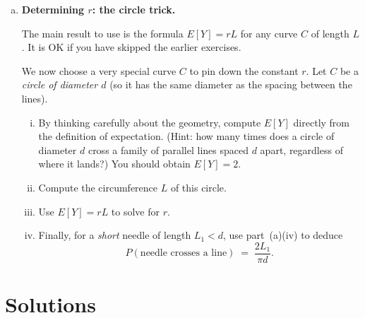 \documentclass[12pt]{article}
\begin{document}
\begin{enumerate}[(a)]
\begin{enumerate}[(i)]
    \item (Optional) Conclude that $E[Y] = rL$ holds for any rectifiable curve $C$
      of length $L$, for the same constant $r$ as before (which we have
      not yet determined).
  \end{enumerate}

\newpage

  \item \textbf{Determining $r$: the circle trick.}
  
  The main result to use is the formula $E[Y] = rL$ for any curve $C$ of length $L$.
  It is OK if you have skipped the earlier exercises.

  We now choose a very special curve $C$ to pin down the constant $r$.
  Let $C$ be a \emph{circle of diameter $d$} (so it has the same diameter
  as the spacing between the lines).

  \begin{enumerate}[(i)]
    \item By thinking carefully about the geometry, compute $E[Y]$
      directly from the definition of expectation. (Hint: how many times
      does a circle of diameter $d$ cross a family of parallel lines
      spaced $d$ apart, regardless of where it lands?) You should
      obtain $E[Y] = 2$.

    \item Compute the circumference $L$ of this circle.

    \item Use $E[Y] = rL$ to solve for $r$.

    \item Finally, for a \emph{short} needle of length $L_1 < d$, use
      part~(a)(iv) to deduce
      \[
        P(\text{needle crosses a line}) \;=\; \frac{2L_1}{\pi d}.
      \]
  \end{enumerate}

\end{enumerate}

\newpage
\section*{Solutions}
\end{document}
